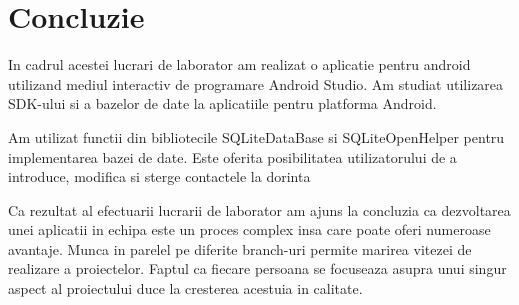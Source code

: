 \section*{Concluzie}


	
	In cadrul acestei lucrari de laborator am realizat o aplicatie pentru android utilizand mediul interactiv de programare Android Studio. Am studiat utilizarea SDK-ului si a bazelor de date la aplicatiile pentru platforma Android.

	Am utilizat functii din bibliotecile SQLiteDataBase si SQLiteOpenHelper pentru implementarea bazei de date. Este oferita posibilitatea utilizatorului de a introduce, modifica si sterge contactele la dorinta

	Ca rezultat al efectuarii lucrarii de laborator am ajuns la concluzia ca dezvoltarea unei aplicatii in echipa este un proces complex insa care poate oferi numeroase avantaje. Munca in parelel pe diferite branch-uri permite marirea vitezei de realizare a proiectelor. Faptul ca fiecare persoana se focuseaza asupra unui singur aspect al proiectului duce la cresterea acestuia in calitate.
\clearpage